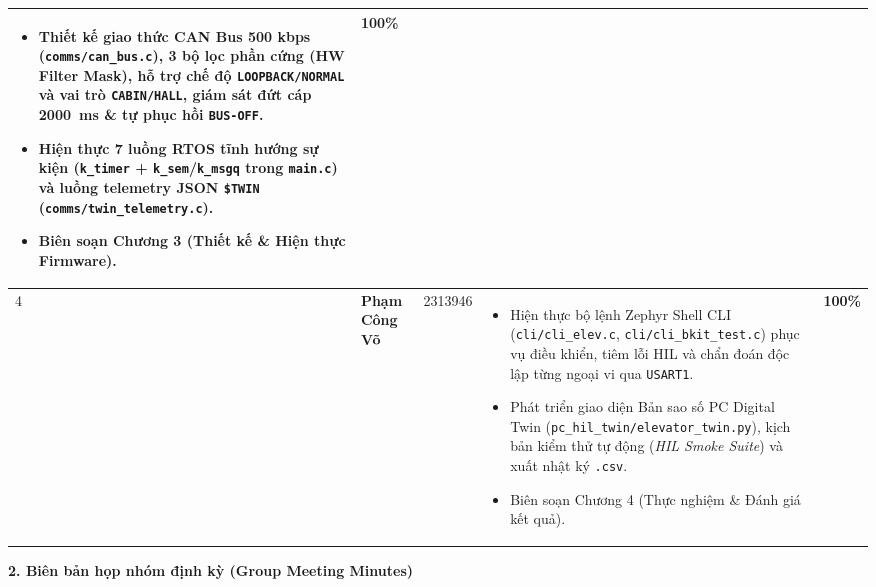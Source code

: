\begin{xltabular}{\textwidth}{|C{0.7cm}|L{3.1cm}|C{1.5cm}|Y|C{1.6cm}|}
\begin{itemize}[nosep, leftmargin=1.1em, topsep=1pt, partopsep=0pt]
    \item Thiết kế giao thức CAN Bus 500 kbps (\texttt{comms/can\_bus.c}), 3 bộ lọc phần cứng (HW Filter Mask), hỗ trợ chế độ \texttt{LOOPBACK/NORMAL} và vai trò \texttt{CABIN/HALL}, giám sát đứt cáp 2000~ms \& tự phục hồi \texttt{BUS-OFF}.
    \item Hiện thực 7 luồng RTOS tĩnh hướng sự kiện (\texttt{k\_timer} + \texttt{k\_sem}/\texttt{k\_msgq} trong \texttt{main.c}) và luồng telemetry JSON \texttt{\$TWIN} (\texttt{comms/twin\_telemetry.c}).
    \item Biên soạn Chương 3 (Thiết kế \& Hiện thực Firmware).
\end{itemize} & \textbf{100\%} \\
\hline
{}
4 & \textbf{Phạm Công Võ} & 2313946 &
\begin{itemize}[nosep, leftmargin=1.1em, topsep=1pt, partopsep=0pt]
    \item Hiện thực bộ lệnh Zephyr Shell CLI (\texttt{cli/cli\_elev.c}, \texttt{cli/cli\_bkit\_test.c}) phục vụ điều khiển, tiêm lỗi HIL và chẩn đoán độc lập từng ngoại vi qua \texttt{USART1}.
    \item Phát triển giao diện Bản sao số PC Digital Twin (\texttt{pc\_hil\_twin/elevator\_twin.py}), kịch bản kiểm thử tự động (\textit{HIL Smoke Suite}) và xuất nhật ký \texttt{.csv}.
    \item Biên soạn Chương 4 (Thực nghiệm \& Đánh giá kết quả).
\end{itemize} & \textbf{100\%} \\
\end{xltabular}
\endgroup

\vspace{0.25cm}
\noindent\textbf{2. Biên bản họp nhóm định kỳ (Group Meeting Minutes)}


